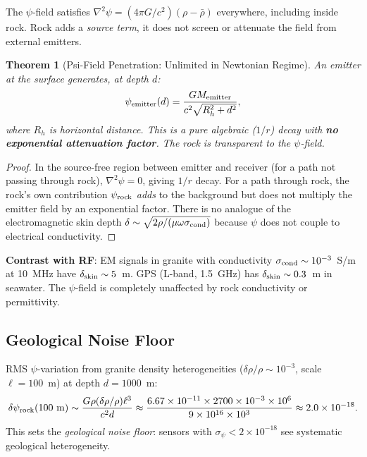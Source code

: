 \documentclass[aps,prd,twocolumn,superscriptaddress,nofootinbib]{revtex4-2}
\newtheorem{theorem}{Theorem}
\begin{document}
The $\psi$-field satisfies $\nabla^2\psi = (4\pi G/c^2)(\rho - \bar\rho)$
everywhere, including inside rock.  Rock adds a \emph{source term},
it does not screen or attenuate the field from external emitters.

\begin{theorem}[Psi-Field Penetration: Unlimited in Newtonian Regime]
\label{thm:penetration}
An emitter at the surface generates, at depth $d$:
\begin{equation}
\psi_{\rm emitter}(d) = \frac{GM_{\rm emitter}}{c^2\sqrt{R_h^2 + d^2}},
\label{eq:psi-depth}
\end{equation}
where $R_h$ is horizontal distance.  This is a pure algebraic ($1/r$)
decay with \textbf{no exponential attenuation factor}.  The rock is
transparent to the $\psi$-field.
\end{theorem}

\begin{proof}
In the source-free region between emitter and receiver (for a path not
passing through rock), $\nabla^2\psi = 0$, giving $1/r$ decay.
For a path through rock, the rock's own contribution $\psi_{\rm rock}$
\emph{adds} to the background but does not multiply the emitter field
by an exponential factor.  There is no analogue of the electromagnetic
skin depth $\delta \sim \sqrt{2\rho/(\mu\omega\sigma_{\rm cond})}$
because $\psi$ does not couple to electrical conductivity.
\end{proof}

\textbf{Contrast with RF}: EM signals in granite with conductivity
$\sigma_{\rm cond} \sim 10^{-3}$~S/m at 10~MHz have
$\delta_{\rm skin} \sim 5$~m.  GPS (L-band, 1.5~GHz) has
$\delta_{\rm skin} \sim 0.3$~m in seawater.  The $\psi$-field is
completely unaffected by rock conductivity or permittivity.

\subsection{Geological Noise Floor}

RMS $\psi$-variation from granite density heterogeneities
($\delta\rho/\rho \sim 10^{-3}$, scale $\ell = 100$~m) at depth $d = 1000$~m:
\begin{equation}
\delta\psi_{\rm rock}(100~\mathrm{m}) \sim \frac{G\rho(\delta\rho/\rho)\ell^3}{c^2 d}
\approx \frac{6.67\times10^{-11}\times2700\times10^{-3}\times10^6}
{9\times10^{16}\times10^3}
\approx 2.0\times10^{-18}.
\label{eq:geo-noise}
\end{equation}
This sets the \emph{geological noise floor}: sensors with
$\sigma_\psi < 2\times10^{-18}$ see systematic geological heterogeneity.
\end{document}
